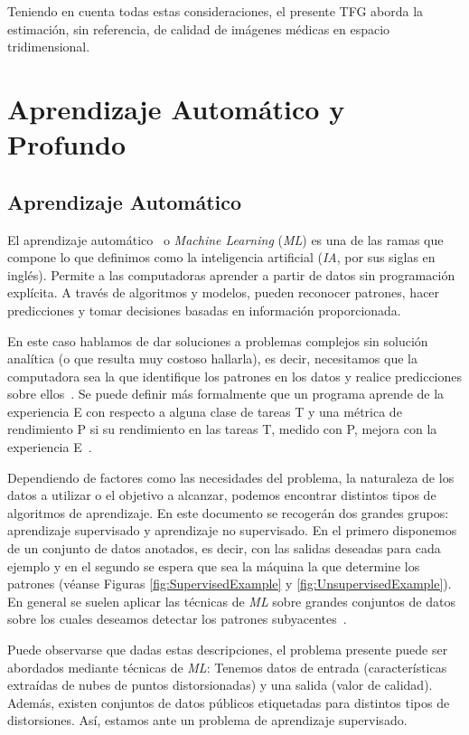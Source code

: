 Teniendo en cuenta todas estas consideraciones, el presente TFG aborda la
estimación, sin referencia, de calidad de imágenes médicas en espacio tridimensional.



\section{Aprendizaje Automático y Profundo}
\subsection{Aprendizaje Automático}
El aprendizaje automático~\cite{IAModernApproach} o \emph{Machine Learning} (\emph{ML}) 
es una de las ramas que compone lo que definimos como 
la inteligencia artificial (\emph{IA}, por sus siglas en inglés). Permite a las computadoras aprender a partir de datos sin programación explícita. 
A través de algoritmos y modelos, pueden reconocer patrones, hacer predicciones y tomar decisiones basadas en información proporcionada.

En este caso hablamos de dar soluciones a problemas complejos sin 
solución analítica (o que resulta muy costoso hallarla), es decir, necesitamos que la computadora sea la que identifique
los patrones en los datos y realice predicciones sobre ellos~\cite{LearningFromData}.
Se puede definir más formalmente que un programa aprende de la experiencia E con
respecto a alguna clase de tareas T y una métrica de rendimiento P si su
rendimiento en las tareas T, medido con P, mejora con la experiencia E~\cite{TomMitchell}.

Dependiendo de factores como las necesidades del problema, la naturaleza
de los datos a utilizar o el objetivo a alcanzar, podemos encontrar distintos tipos de
algoritmos de aprendizaje. En este documento se recogerán dos grandes grupos: aprendizaje supervisado 
y aprendizaje no supervisado. En el primero disponemos de un conjunto de datos 
anotados, es decir, con las salidas deseadas para cada ejemplo y en el segundo 
se espera que sea la máquina la que determine los patrones (véanse Figuras \ref{fig:SupervisedExample} y \ref{fig:UnsupervisedExample}). 
En general se suelen aplicar las técnicas de \emph{ML} sobre grandes conjuntos 
de datos sobre los cuales deseamos detectar los patrones subyacentes~\cite{
DataMiningHandbook}.

Puede observarse que dadas estas descripciones, el problema presente puede ser 
abordados mediante técnicas de \emph{ML}: Tenemos datos de entrada (características 
extraídas de nubes de puntos distorsionadas) y una salida (valor de calidad). Además, existen conjuntos de 
datos públicos etiquetadas para distintos tipos de distorsiones. Así,
estamos ante un problema de aprendizaje supervisado.

